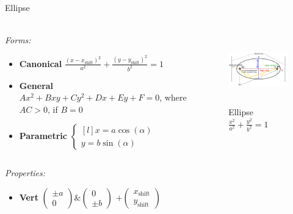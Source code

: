 \documentclass[aspectratio=169]{beamer}
\newcommand{\shf}{\text{shift}}
\begin{document}
    \begin{frame}[t]{Ellipse}
        \framesubtitle{}
            \scriptsize
            \vspace{-0.4cm}
        \begin{columns}[T,onlytextwidth]
            \begin{column}{0.59\textwidth}
                \textit{Forms:} \\
                \begin{itemize}
                    \item \textbf{Canonical} $\frac{(x-x_{\shf})^2}{a^2}+\frac{(y-y_{\shf})^2}{b^2}=1$
                    \item \textbf{General} $Ax^2+Bxy+Cy^2+Dx+Ey+F=0$, where $AC > 0$, if $B=0$
                    \item \textbf{Parametric} $\left\{\begin{matrix*}[l] x = a\cos(\alpha)\\ y = b\sin(\alpha) \end{matrix*}\right.$
                \end{itemize}
            \end{column}
            \begin{column}{0.39\textwidth}
                \vspace{-0.5cm}
                \begin{figure}[H]
                    \centering\includegraphics[height=3cm,width=1\textwidth,keepaspectratio]{Ellipse.png}
                    \vspace{-0.5cm}
                    \caption*{\scriptsize Ellipse $\frac{x^2}{a^2}+\frac{y^2}{b^2}=1$}
                    \label{fig:Ellipse.png}
                \end{figure}
            \end{column}
        \end{columns}
        \vspace{-0.5cm}
        \textit{Properties:}
        \vspace{-0.2cm}
        \begin{multicols}{3}
            \begin{itemize}
                \item \textbf{Vert} $\begin{pmatrix} \pm a\\0 \end{pmatrix}$\&$\begin{pmatrix} 0\\\pm b \end{pmatrix}$ $ + \begin{pmatrix} x_{\shf}\\y_{\shf} \end{pmatrix}$

\end{itemize}
\end{multicols}
\end{frame}
\end{document}
